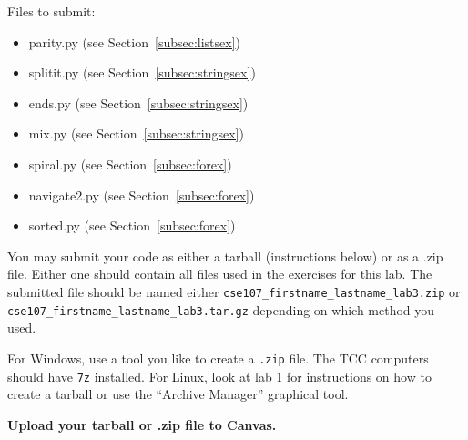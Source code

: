 \documentclass[11pt]{cselabheader}
\begin{document}
Files to submit:
\begin{itemize}
  \item parity.py (see Section~\ref{subsec:listsex})
  \item splitit.py (see Section~\ref{subsec:stringsex})
  \item ends.py (see Section~\ref{subsec:stringsex})
  \item mix.py (see Section~\ref{subsec:stringsex})
  \item spiral.py (see Section~\ref{subsec:forex})
  \item navigate2.py (see Section~\ref{subsec:forex})
  \item sorted.py (see Section~\ref{subsec:forex})
\end{itemize}

You may submit your code as either a tarball (instructions below) or as a .zip
file. Either one should contain all files used in the exercises for this lab.
The submitted file should be named either
\texttt{cse107\_firstname\_lastname\_lab3.zip} or
\texttt{cse107\_firstname\_lastname\_lab3.tar.gz} depending on which method you
used.

For Windows, use a tool you like to create a \texttt{.zip} file. The TCC
computers should have \texttt{7z} installed. For Linux, look at lab 1 for
instructions on how to create a tarball or use the ``Archive Manager'' graphical
tool.

\begin{center}
  \textbf{Upload your tarball or .zip file to Canvas.}
\end{center}
\end{document}
